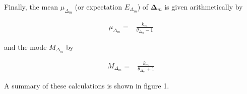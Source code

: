 Finally, the mean $\mu_{\Delta_m}$ (or expectation $E_{\Delta_m}$) of $\mathbf{\Delta}_m$ is given arithmetically by 

\begin{eqnarray}
\mu_{\Delta_m} =& \frac{\displaystyle k_m}{\displaystyle \theta_{\Delta_m} -1} \end{eqnarray}

and the mode $M_{\Delta_m}$ by 

\begin{eqnarray}
M_{\Delta_m} =& \frac{\displaystyle k_m}{\displaystyle \theta_{\Delta_m} +1}
\end{eqnarray}

A summary of these calculations is shown in figure 1. 
